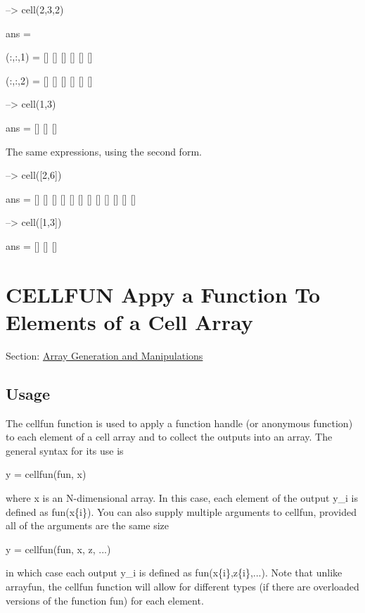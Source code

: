 \begin{DoxyVerbInclude}
--> cell(2,3,2)

ans = 

(:,:,1) = 
 [] [] [] 
 [] [] [] 

(:,:,2) = 
 [] [] [] 
 [] [] [] 

--> cell(1,3)

ans = 
 [] [] [] 
\end{DoxyVerbInclude}


The same expressions, using the second form.


\begin{DoxyVerbInclude}
--> cell([2,6])

ans = 
 [] [] [] [] [] [] 
 [] [] [] [] [] [] 

--> cell([1,3])

ans = 
 [] [] [] 
\end{DoxyVerbInclude}
 \hypertarget{array_cellfun}{}\section{C\-E\-L\-L\-F\-U\-N Appy a Function To Elements of a Cell Array}\label{array_cellfun}
Section\-: \hyperlink{sec_array}{Array Generation and Manipulations} \hypertarget{vtkwidgets_vtkxyplotwidget_Usage}{}\subsection{Usage}\label{vtkwidgets_vtkxyplotwidget_Usage}
The {\ttfamily cellfun} function is used to apply a function handle (or anonymous function) to each element of a cell array and to collect the outputs into an array. The general syntax for its use is \begin{DoxyVerb}   y = cellfun(fun, x)
\end{DoxyVerb}
 where {\ttfamily x} is an N-\/dimensional array. In this case, each element of the output {\ttfamily y\-\_\-i} is defined as {\ttfamily fun(x\{i\})}. You can also supply multiple arguments to {\ttfamily cellfun}, provided all of the arguments are the same size \begin{DoxyVerb}   y = cellfun(fun, x, z, ...)
\end{DoxyVerb}
 in which case each output {\ttfamily y\-\_\-i} is defined as {\ttfamily fun(x\{i\},z\{i\},...)}. Note that unlike {\ttfamily arrayfun}, the {\ttfamily cellfun} function will allow for different types (if there are overloaded versions of the function {\ttfamily fun}) for each element.

